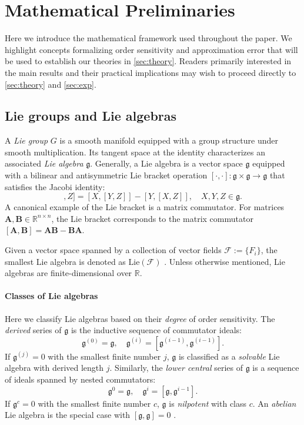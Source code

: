 \documentclass{article}
\theoremstyle{plain}
\theoremstyle{definition}
\theoremstyle{remark}
\newcommand{\fr}[1]{\mathfrak{#1}}
\newcommand{\mcal}[1]{\mathcal{#1}}
\newcommand{\mbf}[1]{\mathbf{#1}}
\newcommand{\bb}[1]{\mathbb{#1}}
\begin{document}
\section{Mathematical Preliminaries}
\label{sec:math_prelim}
Here we introduce the mathematical framework used throughout the paper.
We highlight concepts formalizing order sensitivity and approximation error that will be used to establish our theories in \cref{sec:theory}.
Readers primarily interested in the main results and their practical implications may wish to proceed directly to \cref{sec:theory} and \cref{sec:exp}.

\subsection{Lie groups and Lie algebras}
\label{sec:LieAlgebra}
A \emph{Lie group} $G$ is a smooth manifold equipped with a group structure under smooth multiplication.
Its tangent space at the identity characterizes an associated \emph{Lie algebra} $\fr{g}$.
Generally, a Lie algebra is a vector space $\fr{g}$ equipped with a bilinear and antisymmetric Lie bracket operation $[\cdot, \cdot]: \fr{g} \times \fr{g} \to \fr{g}$ that satisfies the Jacobi identity:
\begin{equation*}
    [[X,Y],Z] = [X,[Y,Z]] - [Y,[X,Z]],
    \quad X,Y,Z \in \fr{g}.
\end{equation*}
A canonical example of the Lie bracket is a matrix commutator.
For matrices
$\mbf{A}, \mbf{B} \in \bb{R}^{n \times n}$,
the Lie bracket corresponds to the matrix commutator $[\mbf{A},\mbf{B}] = \mbf{A}\mbf{B} - \mbf{B}\mbf{A}$.

Given a vector space spanned by a collection of vector fields $\mcal{F}:= \{F_i\}$, the smallest Lie algebra is denoted as $\text{Lie}(\mcal{F})$ \cite{iserles2000lie}.
Unless otherwise mentioned, Lie algebras are finite-dimensional over $\bb{R}$.

\paragraph{Classes of Lie algebras}
Here we classify Lie algebras based on their \emph{degree} of order sensitivity.
The \emph{derived} series of $\fr{g}$ is the inductive sequence of commutator ideals:
\begin{equation*}
    \fr{g}^{(0)} = \fr{g},
    \quad
    \fr{g}^{(i)} = [\fr{g}^{(i-1)},\fr{g}^{(i-1)}].
\end{equation*}
If $\fr{g}^{(j)} = 0$ with the smallest finite number $j$, $\fr{g}$ is classified as a \emph{solvable} Lie algebra with derived length $j$.
Similarly, the \emph{lower central} series of $\fr{g}$ is a sequence of ideals spanned by nested commutators:
\begin{equation*}
    \fr{g}^0 = \fr{g},
    \quad
    \fr{g}^i = [\fr{g},\fr{g}^{i-1}].
\end{equation*}
If $\fr{g}^c = 0$ with the smallest finite number $c$, $\fr{g}$ is \emph{nilpotent} with class $c$.
An \emph{abelian} Lie algebra is the special case with $[\fr{g},\fr{g}]=0$ \cite{hall2013lie}.
\end{document}

